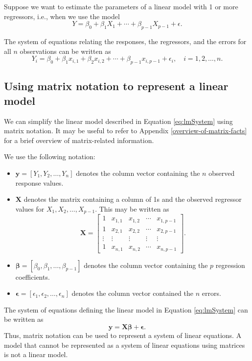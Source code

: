 \documentclass[
]{book}
\providecommand{\tightlist}{%
  \setlength{\itemsep}{0pt}\setlength{\parskip}{0pt}}
\theoremstyle{definition}
\theoremstyle{definition}
\theoremstyle{definition}
\theoremstyle{definition}
\theoremstyle{remark}
\begin{document}
Suppose we want to estimate the parameters of a linear model with 1 or more regressors, i.e., when we use the model
\[
Y=\beta_0 + \beta_1 X_1 + \cdots + \beta_{p-1} X_{p-1} + \epsilon.
\]

The system of equations relating the responses, the regressors, and the errors for all \(n\) observations can be written as
\[
Y_i = \beta_0 + \beta_1 x_{i,1} + \beta_2 x_{i,2} + \cdots + \beta_{p-1} x_{i,p-1} + \epsilon_i,\quad i=1,2,\ldots,n.
\label{eq:lmSystem}
\]

\hypertarget{using-matrix-notation-to-represent-a-linear-model}{%
\subsection{Using matrix notation to represent a linear model}\label{using-matrix-notation-to-represent-a-linear-model}}

We can simplify the linear model described in Equation \eqref{eq:lmSystem} using matrix notation. It may be useful to refer to Appendix \ref{overview-of-matrix-facts} for a brief overview of matrix-related information.

We use the following notation:

\begin{itemize}
\tightlist
\item
  \(\mathbf{y} = [Y_1, Y_2, \ldots, Y_n]\) denotes the column vector containing the \(n\) observed response values.
\item
  \(\mathbf{X}\) denotes the matrix containing a column of 1s and the observed regressor values for \(X_1, X_2, \ldots, X_{p-1}\). This may be written as
  \[\mathbf{X} = \begin{bmatrix}
  1 & x_{1,1} & x_{1,2} & \cdots & x_{1,p-1} \\
  1 & x_{2,1} & x_{2,2} & \cdots & x_{2,p-1} \\
  \vdots & \vdots & \vdots & \vdots & \vdots \\
  1 & x_{n,1} & x_{n,2} & \cdots & x_{n,p-1}
  \end{bmatrix}.\]
\item
  \(\boldsymbol{\beta} = [\beta_0, \beta_1, \ldots, \beta_{p-1}]\) denotes the column vector containing the \(p\) regression coefficients.
\item
  \(\boldsymbol{\epsilon} = [\epsilon_1, \epsilon_2, \ldots, \epsilon_n]\) denotes the column vector contained the \(n\) errors.
\end{itemize}

The system of equations defining the linear model in Equation \eqref{eq:lmSystem} can be written as
\[
\mathbf{y} = \mathbf{X}\boldsymbol{\beta} + \boldsymbol{\epsilon}.
\]
Thus, matrix notation can be used to represent a system of linear equations. A model that cannot be represented as a system of linear equations using matrices is not a linear model.
\end{document}
